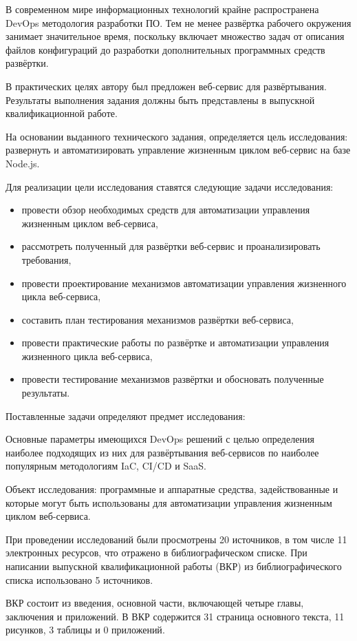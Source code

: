 \Introduction

В современном мире информационных технологий крайне распространена DevOps методология разработки ПО\cite{projectPhoenix}.
Тем не менее развёртка рабочего окружения занимает значительное время, поскольку включает множество задач от
описания файлов конфигураций до разработки дополнительных программных средств развёртки.

В практических целях автору был предложен веб-сервис для развёртывания.
Результаты выполнения задания должны быть представлены в выпускной квалификационной работе.

На основании выданного технического задания, определяется цель исследования: развернуть и автоматизировать управление жизненным циклом веб-сервис на базе Node.js.

Для реализации цели исследования ставятся следующие задачи исследования:

\begin{itemize}
    \item провести обзор необходимых средств для автоматизации управления жизненным циклом веб-сервиса,
    \item рассмотреть полученный для развёртки веб-сервис и проанализировать требования,
    \item провести проектирование механизмов автоматизации управления жизненного цикла веб-сервиса,
    \item составить план тестирования механизмов развёртки веб-сервиса,
    \item провести практические работы по развёртке и автоматизации управления жизненного цикла веб-сервиса,
    \item провести тестирование механизмов развёртки и обосновать полученные результаты.
\end{itemize}

Поставленные задачи определяют предмет исследования:

Основные параметры имеющихся DevOps решений с целью определения наиболее подходящих из них для развёртывания веб-сервисов
по наиболее популярным методологиям IaC, CI/CD и SaaS.

Объект исследования: программные и аппаратные средства, задействованные и которые могут быть использованы для автоматизации управления жизненным циклом веб-сервиса.

При проведении исследований были просмотрены 20 источников, в том числе 11 электронных ресурсов, что отражено в библиографическом списке.
При написании выпускной квалификационной работы (ВКР) из библиографического списка использовано 5 источников.

ВКР состоит из введения, основной части, включающей четыре главы, заключения и приложений.
В ВКР содержится 31 страница основного текста, 11 рисунков, 3 таблицы и 0 приложений\cite{vkrsen}.